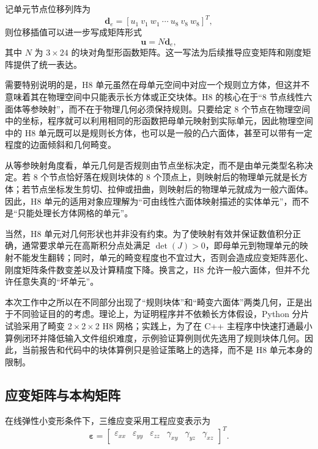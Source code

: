 \documentclass[12pt,a4paper]{article}
\begin{document}
记单元节点位移列阵为
\begin{equation}
\bm{d}_e = [u_1\ v_1\ w_1\ \cdots\ u_8\ v_8\ w_8]^T,
\end{equation}
则位移插值可以进一步写成矩阵形式
\begin{equation}
\bm{u}=N\bm{d}_e,
\end{equation}
其中 $N$ 为 $3\times24$ 的块对角型形函数矩阵。这一写法为后续推导应变矩阵和刚度矩阵提供了统一表达。

需要特别说明的是，H8 单元虽然在母单元空间中对应一个规则立方体，但这并不意味着其在物理空间中只能表示长方体或正交块体。H8 的核心在于“8 节点线性六面体等参映射”，而不在于物理几何必须保持规则。只要给定 8 个节点在物理空间中的坐标，程序就可以利用相同的形函数把母单元映射到实际单元，因此物理空间中的 H8 单元既可以是规则长方体，也可以是一般的凸六面体，甚至可以带有一定程度的边面倾斜和几何畸变。

从等参映射角度看，单元几何是否规则由节点坐标决定，而不是由单元类型名称决定。若 8 个节点恰好落在规则块体的 8 个顶点上，则映射后的物理单元就是长方体；若节点坐标发生剪切、拉伸或扭曲，则映射后的物理单元就成为一般六面体。因此，H8 单元的适用对象应理解为“可由线性六面体映射描述的实体单元”，而不是“只能处理长方体网格的单元”。

当然，H8 单元对几何形状也并非没有约束。为了使映射有效并保证数值积分正确，通常要求单元在高斯积分点处满足 $\det(J)>0$，即母单元到物理单元的映射不能发生翻转；同时，单元的畸变程度也不宜过大，否则会造成应变矩阵恶化、刚度矩阵条件数变差以及计算精度下降。换言之，H8 允许一般六面体，但并不允许任意失真的“坏单元”。

本次工作中之所以在不同部分出现了“规则块体”和“畸变六面体”两类几何，正是出于不同验证目的的考虑。理论上，为证明程序并不依赖长方体假设，Python 分片试验采用了畸变 2\,$\times$\,2\,$\times$\,2 H8 网格；实践上，为了在 C++ 主程序中快速打通最小算例闭环并降低输入文件组织难度，示例验证算例则优先选用了规则块体几何。因此，当前报告和代码中的块体算例只是验证策略上的选择，而不是 H8 单元本身的限制。

\subsection{应变矩阵与本构矩阵}

在线弹性小变形条件下，三维应变采用工程应变表示为
\begin{equation}
\bm{\varepsilon} =
\begin{bmatrix}
\varepsilon_{xx} & \varepsilon_{yy} & \varepsilon_{zz} & \gamma_{xy} & \gamma_{yz} & \gamma_{xz}
\end{bmatrix}^{T}.
\end{equation}
\end{document}
